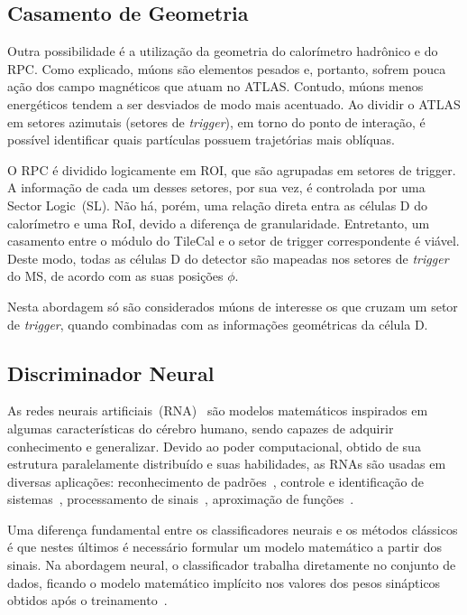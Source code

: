 \subsection*{Casamento de Geometria}

Outra possibilidade é a utilização da geometria do calorímetro hadrônico e do
RPC. Como explicado, múons são elementos pesados e, portanto, sofrem pouca ação
dos campo magnéticos que atuam no ATLAS. Contudo, múons menos energéticos tendem
a ser desviados de modo mais acentuado. Ao dividir o ATLAS em setores azimutais
(setores de \emph{trigger}), em torno do ponto de interação, é possível
identificar quais partículas possuem trajetórias mais oblíquas.

O RPC é dividido logicamente em ROI, que são agrupadas em
setores de trigger. A informação de cada um desses setores, por sua vez, é
controlada por uma Sector Logic~(SL). Não há, porém, uma relação direta entra
as células D do calorímetro e uma RoI, devido a diferença de granularidade.
Entretanto, um casamento entre o módulo do TileCal e o setor de trigger
correspondente é viável. Deste modo, todas as células D do detector são
mapeadas nos setores de
\emph{trigger} do MS, de acordo com as suas posições $\phi$.

Nesta abordagem só são considerados múons de interesse os que cruzam um setor de
\emph{trigger}, quando combinadas com as informações geométricas da célula D.



\subsection*{Discriminador Neural}

As redes neurais artificiais~(RNA)~\cite{WASSERMAN1989,HAYKIN2008} são modelos
matemáticos inspirados em algumas características do cérebro humano, sendo
capazes de adquirir conhecimento e generalizar. Devido ao poder computacional,
obtido de sua estrutura paralelamente distribuído e suas habilidades, as RNAs
são usadas em diversas aplicações: reconhecimento de padrões~\cite{BISHOP1995},
controle e identificação de sistemas~\cite{ICHIKAWA1992}, processamento de
sinais~\cite{LAPEDES1987}, aproximação de funções~\cite{DENG2011}.

Uma diferença fundamental entre os classificadores neurais e os métodos
clássicos é que nestes últimos é necessário formular um modelo matemático a
partir dos sinais. Na abordagem neural, o classificador trabalha diretamente no
conjunto de dados, ficando o modelo matemático implícito nos valores dos pesos
sinápticos obtidos após o treinamento~\cite{ref:SIMAS}.

